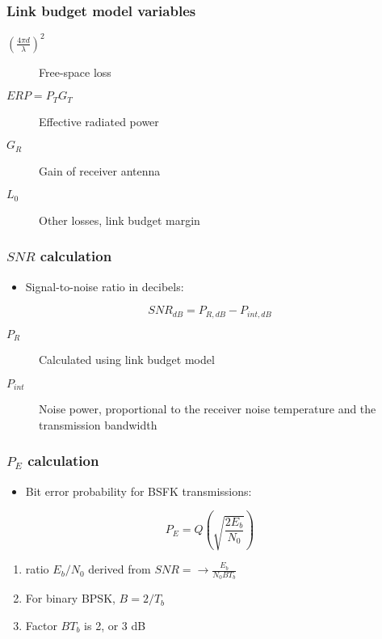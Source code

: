 \documentclass{beamer}
\begin{document}
\begin{frame}
	\frametitle{Link budget model variables}
	\begin{description}
		\item[$(\frac{4 \pi d}{\lambda})^2$] Free-space loss
		\item[$ERP = P_T G_T$] Effective radiated power
		\item[$G_R$] Gain of receiver antenna
		\item[$L_0$] Other losses, link budget margin
	\end{description}
\end{frame}

\begin{frame}
	\frametitle{$SNR$ calculation}
	\begin{itemize}
		\item Signal-to-noise ratio in decibels:
	\end{itemize}
	\begin{equation}
		{SNR}_{dB} = P_{R, dB} - P_{int, dB}
	\end{equation}
	\begin{description}
		\item[$P_R$] Calculated using link budget model
		\item[$P_{int}$] Noise power, proportional to the receiver noise temperature and the transmission bandwidth
	\end{description}
\end{frame}

\begin{frame}
	\frametitle{$P_E$ calculation}
	\begin{itemize}
		\item Bit error probability for BSFK transmissions:
	\end{itemize}
	\begin{equation}
		P_E = Q\left(\sqrt{\frac{2E_b}{N_0}}\right)
	\end{equation}
	\begin{enumerate}
		\item ratio $E_b / N_0$ derived from $SNR = \rightarrow \frac{E_b}{N_0 B T_b}$
		\item For binary BPSK, $B = 2/T_b$
		\item Factor $B T_b$ is 2, or 3 dB
	\end{enumerate}
\end{frame}
\end{document}
